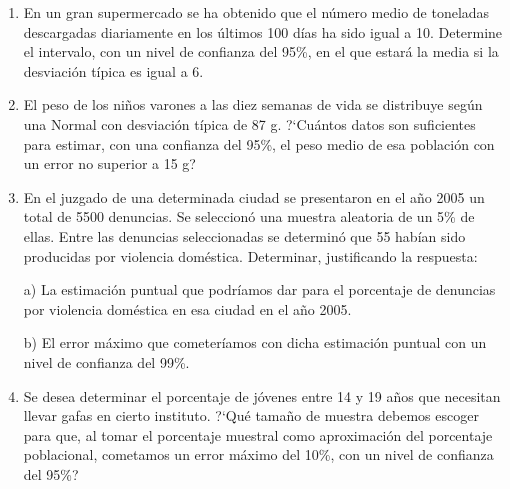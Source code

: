 \begin{adjustwidth}{20pt}{10pt}
\begin{enumerate}[PB. 1. ]	
	\item 	En un gran supermercado se ha obtenido que el número medio de toneladas descargadas diariamente en los últimos 100 días ha sido igual a 10. Determine el intervalo, con un nivel de confianza del 95\%, en el que estará la media si la desviación típica es igual a 6. 
			
		\hspace{-1cm}\vspace{1cm}
		
	\item 	El peso de los niños varones a las diez semanas de vida se distribuye según una Normal con desviación típica de 87 g. ?`Cuántos datos son suficientes para estimar, con una confianza del 95\%, el peso medio de esa población con un error no superior a 15 g?
		
		\hspace{-1cm}\vspace{2cm}
		
	\item 	En el juzgado de una determinada ciudad se presentaron en el año 2005 un total de 5500 denuncias. Se seleccionó una muestra aleatoria de un 5\% de ellas. Entre las denuncias seleccionadas se determinó que 55 habían sido producidas por violencia doméstica. Determinar, justificando la respuesta:
	
a) La estimación puntual que podríamos dar para el porcentaje de denuncias por violencia doméstica en esa ciudad en el año 2005.

b) El error máximo que cometeríamos con dicha estimación puntual con un nivel de confianza del 99\%. 
		
		\hspace{-1cm}\vspace{1cm}
		
	\item 	Se desea determinar el porcentaje de jóvenes entre 14 y 19 años que necesitan llevar gafas en cierto instituto. ?`Qué tamaño de muestra debemos escoger para que, al tomar el porcentaje muestral como aproximación del porcentaje poblacional, cometamos un error máximo del 10\%, con un nivel de confianza del 95\%?
		
		\hspace{-1cm}\vspace{1cm}
		

\end{enumerate}
\end{adjustwidth}
